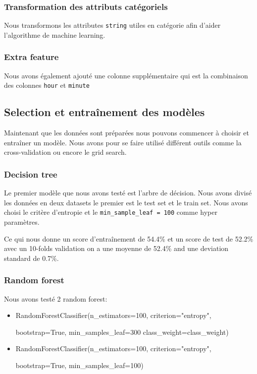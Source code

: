 
\subsubsection{Transformation des attributs catégoriels}
Nous transformons les attributes \lstinline!string! utiles en catégorie afin d'aider l'algorithme de machine learning.

\subsubsection{Extra feature}
Nous avons également ajouté une colonne supplémentaire qui est la combinaison des colonnes \lstinline!hour! et \lstinline!minute!


\subsection{Selection et entraînement des modèles}
Maintenant que les données sont préparées nous pouvons commencer à choisir et entraîner un modèle. Nous avons pour se faire utilisé différent outils comme la cross-validation ou encore le grid search.

\subsubsection{Decision tree}
Le premier modèle que nous avons testé est l'arbre de décision. Nous avons divisé les données en deux datasets le premier est le test set et le train set. Nous avons choisi le critère d'entropie et le \lstinline!min_sample_leaf = 100! comme hyper paramètres.

Ce qui nous donne un score d'entraînement de 54.4\% et un score de test de 52.2\% avec un 10-folds validation on a une moyenne de 52.4\% and une deviation standard de 0.7\%.

\subsubsection{Random forest}
Nous avons testé 2 random forest:
\begin{itemize}
    \item RandomForestClassifier(n\_estimators=100, criterion="entropy",
    
    bootstrap=True, min\_samples\_leaf=300 class\_weight=class\_weight)
    \item RandomForestClassifier(n\_estimators=100, criterion="entropy",
    
    bootstrap=True, min\_samples\_leaf=100)
\end{itemize}

